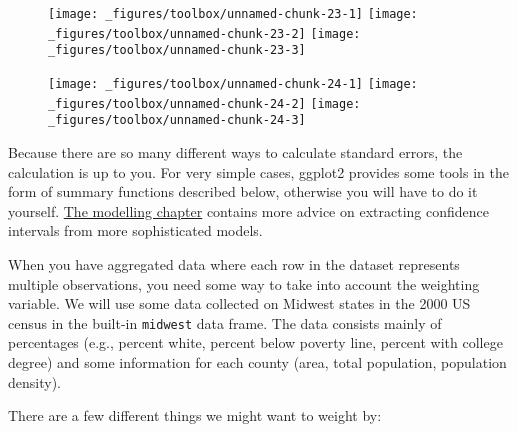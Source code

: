 \begin{figure}[H]
  \texttt{[image: \_figures/toolbox/unnamed-chunk-23-1]}%
  \texttt{[image: \_figures/toolbox/unnamed-chunk-23-2]}%
  \texttt{[image: \_figures/toolbox/unnamed-chunk-23-3]}
\end{figure}

\begin{Shaded}
\begin{Highlighting}[]
\StringTok{ }\NormalTok{()}
\StringTok{ }\NormalTok{()}
\StringTok{ }\NormalTok{()}
\end{Highlighting}
\end{Shaded}

\begin{figure}[H]
  \texttt{[image: \_figures/toolbox/unnamed-chunk-24-1]}%
  \texttt{[image: \_figures/toolbox/unnamed-chunk-24-2]}%
  \texttt{[image: \_figures/toolbox/unnamed-chunk-24-3]}
\end{figure}

Because there are so many different ways to calculate standard errors,
the calculation is up to you.  For very simple
cases, ggplot2 provides some tools in the form of summary functions
described below, otherwise you will have to do it yourself.
\hyperref[cha:modelling]{The modelling chapter} contains more advice on
extracting confidence intervals from more sophisticated models.


When you have aggregated data where each row in the dataset represents
multiple observations, you need some way to take into account the
weighting variable. We will use some data collected on Midwest states in
the 2000 US census in the built-in \texttt{midwest} data frame. The data
consists mainly of percentages (e.g., percent white, percent below
poverty line, percent with college degree) and some information for each
county (area, total population, population density). 

There are a few different things we might want to weight by:

